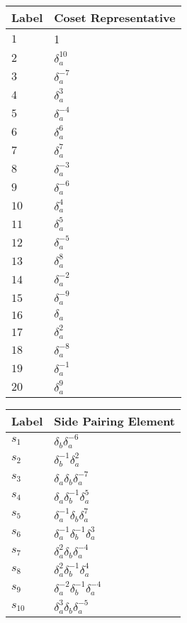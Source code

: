 \documentclass{article}
\begin{document}

\begin{center}
\begin{tabular}{ll}
\toprule
Label & Coset Representative\\
\midrule
$1$ & 1 \\
$2$ & $\delta_a^{10}$ \\
$3$ & $\delta_a^{-7}$ \\
$4$ & $\delta_a^{3}$ \\
$5$ & $\delta_a^{-4}$ \\
$6$ & $\delta_a^{6}$ \\
$7$ & $\delta_a^{7}$ \\
$8$ & $\delta_a^{-3}$ \\
$9$ & $\delta_a^{-6}$ \\
$10$ & $\delta_a^{4}$ \\
$11$ & $\delta_a^{5}$ \\
$12$ & $\delta_a^{-5}$ \\
$13$ & $\delta_a^{8}$ \\
$14$ & $\delta_a^{-2}$ \\
$15$ & $\delta_a^{-9}$ \\
$16$ & $\delta_a^{}$ \\
$17$ & $\delta_a^{2}$ \\
$18$ & $\delta_a^{-8}$ \\
$19$ & $\delta_a^{-1}$ \\
$20$ & $\delta_a^{9}$ \\
\bottomrule
\end{tabular}
\hfill
\begin{tabular}{ll}
\toprule
Label & Side Pairing Element\\
\midrule
$s_{1}$ & $\delta_b^{}\delta_a^{-6}$ \\
$s_{2}$ & $\delta_b^{-1}\delta_a^{2}$ \\
$s_{3}$ & $\delta_a^{}\delta_b^{}\delta_a^{-7}$ \\
$s_{4}$ & $\delta_a^{}\delta_b^{-1}\delta_a^{5}$ \\
$s_{5}$ & $\delta_a^{-1}\delta_b^{}\delta_a^{7}$ \\
$s_{6}$ & $\delta_a^{-1}\delta_b^{-1}\delta_a^{3}$ \\
$s_{7}$ & $\delta_a^{2}\delta_b^{}\delta_a^{-4}$ \\
$s_{8}$ & $\delta_a^{2}\delta_b^{-1}\delta_a^{4}$ \\
$s_{9}$ & $\delta_a^{-2}\delta_b^{-1}\delta_a^{-4}$ \\
$s_{10}$ & $\delta_a^{3}\delta_b^{}\delta_a^{-5}$ \\

\end{tabular}
\end{center}
\end{document}
